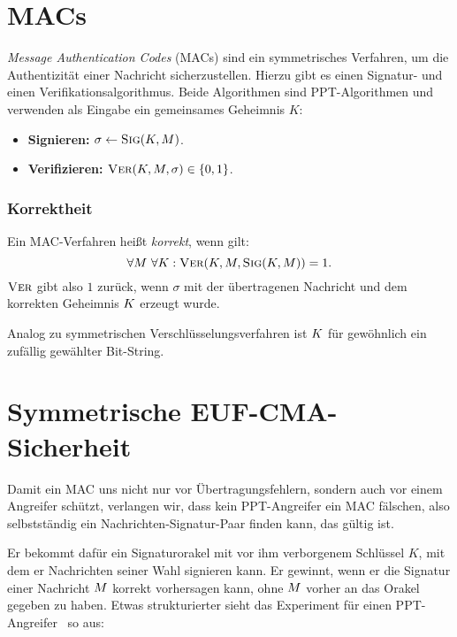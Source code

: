 \section{MACs}
\label{ch:symauth:macs} \emph{Message Authentication Codes} (MACs)
\indexMAC sind ein symmetrisches Verfahren, um die Authentizität einer
Nachricht sicherzustellen. Hierzu gibt es einen Signatur- und einen
Verifikationsalgorithmus. Beide Algorithmen sind PPT-Algorithmen und
verwenden als Eingabe ein gemeinsames Geheimnis $K$:

\begin{itemize}
\item \textbf{Signieren:} $\sigma \leftarrow \textsc{Sig}(K,M)$.
\item \textbf{Verifizieren:} $\textsc{Ver}(K,M,\sigma) \in \{0,1\}$.
\end{itemize}
\subsubsection*{Korrektheit} Ein MAC-Verfahren heißt \textit{korrekt},
wenn gilt:
\[ \forall M~\forall K: \textsc{Ver}(K, M, \textsc{Sig}(K,
  M)) =1.
\] $\textsc{Ver}$ gibt also $1$ zurück, wenn $\sigma$ mit der übertragenen
Nachricht und dem korrekten Geheimnis $K$ erzeugt wurde.

Analog zu symmetrischen Verschlüsselungsverfahren ist $K$ für
gewöhnlich ein zufällig gewählter Bit-String.

\section{Symmetrische EUF-CMA-Sicherheit}\indexEUFCMA
\label{ch:symauth:sicherheit} Damit ein MAC uns nicht nur vor
Übertragungsfehlern, sondern auch vor einem Angreifer schützt, verlangen
wir, dass kein PPT-Angreifer ein MAC fälschen, also selbstständig ein
Nachrichten-Signatur-Paar finden kann, das gültig ist.

Er bekommt dafür ein Signaturorakel mit vor ihm verborgenem Schlüssel
$K$, mit dem er Nachrichten seiner Wahl signieren kann. Er gewinnt, wenn
er die Signatur einer Nachricht $M$ korrekt vorhersagen kann, ohne
$M$ vorher an das Orakel gegeben zu haben. Etwas strukturierter
sieht das Experiment für einen PPT-Angreifer \A~so aus:

